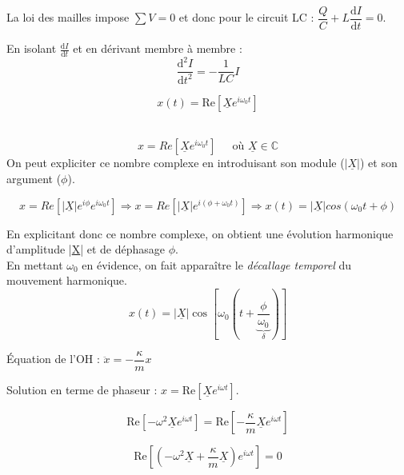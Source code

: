 \documentclass	[11pt, a4paper, openany]{book}
\newcommand{\dif}{\mathrm{d}}
\newcommand{\phas}[1]{\underline{#1}}
\newcommand{\RE}{\text{Re}}
\begin{document}
La loi des mailles impose $\sum V = 0$ et donc pour le circuit LC : $\dfrac{Q}{C}+L\dfrac{\dif I}{\dif t}=0$.

En isolant $\frac{\dif I}{\dif t}$ et en dérivant membre à membre : $$ \dfrac{\dif^2 I}{\dif t^2} = -\dfrac{1}{LC} I $$


$$ x(t) = \RE \left[\phas{X}e^{i\omega_0t}\right] $$
\

$$x = Re\left[\underline{X}e^{i\omega_0 t} \right]\ \ \ \ \ \text{ où }\underline{X} \in \mathbb{C}$$
On peut expliciter ce nombre complexe en introduisant son module ($|\underline{X}|$) et son argument ($\phi$).

$$x = Re\left[|\underline{X}|e^{i\phi}e^{i\omega_0t}\right] \Rightarrow x = Re\left[|\underline{X}|e^{i(\phi + \omega_0 t)}\right] \Rightarrow x(t) = |\underline{X}|cos(\omega_0 t + \phi)$$

En explicitant donc ce nombre complexe, on obtient une évolution harmonique d'amplitude |\underline{X}| et de déphasage $\phi$.\\

En mettant $\omega_0$ en évidence, on fait apparaître le \textit{décallage temporel} du mouvement harmonique.
$$x(t) = |\underline{X}|\cos\left[\omega_0\left(t+\underbrace{\frac{\phi}{\omega_0}}_{\delta}\right)\right]$$



Équation de l'OH : $\ddot{x}=-\dfrac{\kappa}{m}x$

Solution en terme de phaseur : $x=\RE \left[ \phas{X}e^{i\omega t}\right]$.

$$\RE\left[ -\omega^2\phas{X}e^{i\omega t}\right] =\RE\left[ -\dfrac{\kappa}{m}\phas{X}e^{i\omega t}\right]$$

$$\RE \left[ \left( -\omega^2\phas{X}+\dfrac{\kappa}{m}\phas{X}\right) e^{i\omega t}\right] = 0$$
\end{document}
